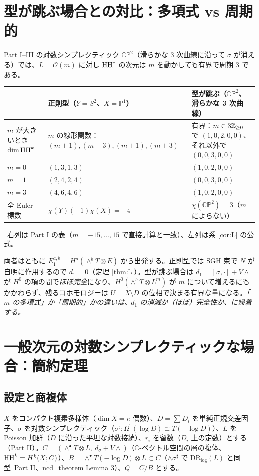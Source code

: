 \section{型が跳ぶ場合との対比：多項式 vs 周期的}\label{sec:contrast}
Part I--III の対数シンプレクティック $\mathbb{CP}^2$（滑らかな 3 次曲線に沿って $\sigma$ が消える）では、$L=\mathcal O(m)$ に対し $\mathrm{HH}^*$ の次元は $m$ を動かしても有界で周期 3 である。
\begin{center}\small
\begin{tabular}{p{3.6cm}p{4.0cm}p{5.4cm}}\toprule
 & 正則型（$Y=S^2$、$X=\mathbb P^1$） & 型が跳ぶ（$\mathbb{CP}^2$、滑らかな 3 次曲線）\\\midrule
$m$ が大きいとき $\dim\mathrm{HH}^k$ & $m$ の線形関数：$(m+1),(m+3),(m+1),(m+3)$ & 有界：$m\in3\mathbb Z_{\ge0}$ で $(1,0,2,0,0)$、それ以外で $(0,0,3,0,0)$\\\midrule
$m=0$ & $(1,3,1,3)$ & $(1,0,2,0,0)$\\\midrule
$m=1$ & $(2,4,2,4)$ & $(0,0,3,0,0)$\\\midrule
$m=3$ & $(4,6,4,6)$ & $(1,0,2,0,0)$\\\midrule
全 Euler 標数 & $\chi(Y)(-1)\chi(X)=-4$ & $\chi(\mathbb{CP}^2)=3$（$m$ によらない）\\\bottomrule
\end{tabular}
\end{center}
\tV\ 右列は Part I の表（$m=-15,\dots,15$ で直接計算と一致）、左列は系 \ref{cor:L} の公式。
\begin{obs}\tP\label{obs:contrast}
両者はともに $E_1^{a,b}=H^a(\wedge^bT\otimes E)$ から出発する。正則型では SGH 束で $N$ が自明に作用するので $d_1=0$（定理 \ref{thm:L}）。型が跳ぶ場合は $d_1=[\sigma,\cdot]+V\wedge$ が $H^0$ の項の間で\emph{ほぼ完全}になり、$H^0(\wedge^bT\otimes L^m)$ が $m$ について増えるにもかかわらず、残るコホモロジーは $U=X\setminus D$ の位相で決まる有界な量になる。\emph{「$m$ の多項式」か「周期的」かの違いは、$d_1$ の消滅か（ほぼ）完全性か、に帰着する。}
\end{obs}

\section{一般次元の対数シンプレクティックな場合：簡約定理}\label{sec:log}
\subsection{設定と商複体}\label{sec:Q}
$X$ をコンパクト複素多様体（$\dim X=n$ 偶数）、$D=\sum D_i$ を単純正規交差因子、$\sigma$ を対数シンプレクティック（$\sigma^\sharp:\Omega^1(\log D)\cong T(-\log D)$）、$L$ を Poisson 加群（$D$ に沿った平坦な対数接続）、$r_i$ を留数（$D_i$ 上の定数）とする（Part II）。$C=(\wedge^\bullet T\otimes L,\ d_\sigma+V\wedge)$（$\mathbb C$-ベクトル空間の層の複体、$\mathrm{HH}^k=H^k(X;C)$）、$B=\wedge^\bullet T(-\log D)\otimes L\subset C$（$\wedge\sigma^\sharp$ で $\mathrm{DR}_{\log}(L)$ と同型\tC\ Part II、ncd\_theorem Lemma 3）、$Q=C/B$ とする。


